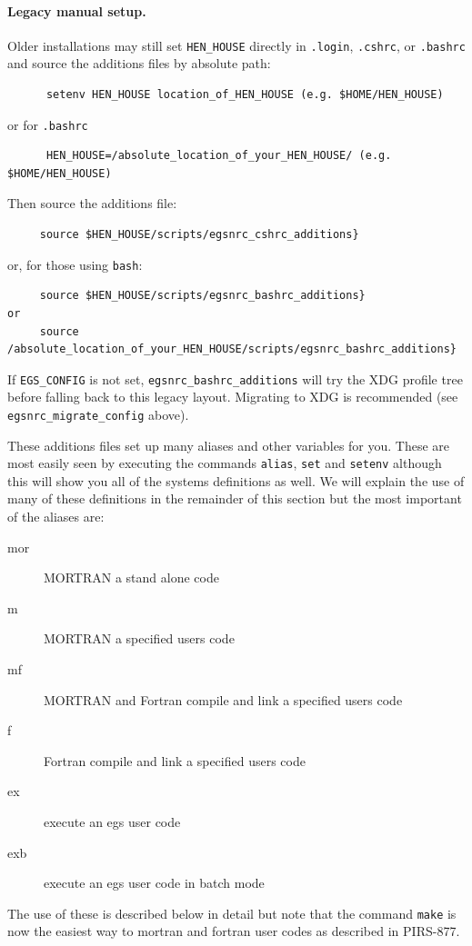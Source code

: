 \paragraph{Legacy manual setup.}
Older installations may still set \verb+HEN_HOUSE+ directly in
{\tt .login}, {\tt .cshrc}, or {\tt .bashrc} and source the additions
files by absolute path:
\begin{verbatim}
      setenv HEN_HOUSE location_of_HEN_HOUSE (e.g. $HOME/HEN_HOUSE)
\end{verbatim}
or for {\tt .bashrc}
\begin{verbatim}
      HEN_HOUSE=/absolute_location_of_your_HEN_HOUSE/ (e.g. $HOME/HEN_HOUSE)
\end{verbatim}
Then source the additions file:
\begin{verbatim}
     source $HEN_HOUSE/scripts/egsnrc_cshrc_additions}
\end{verbatim}
or, for those using {\tt bash}:
\begin{verbatim}
     source $HEN_HOUSE/scripts/egsnrc_bashrc_additions}
or
     source /absolute_location_of_your_HEN_HOUSE/scripts/egsnrc_bashrc_additions}
\end{verbatim}
If \verb+EGS_CONFIG+ is not set, \verb+egsnrc_bashrc_additions+ will try the
XDG profile tree before falling back to this legacy layout.
Migrating to XDG is recommended (see \verb+egsnrc_migrate_config+ above).

These additions files set up many aliases and other variables for you. These
are most easily seen by executing the commands {\tt alias}, {\tt set} and
{\tt setenv} although this will show you all of the systems definitions as
well.  We will explain the use of many of these definitions in the
remainder of this section but the most important of the aliases are:

     
  
\begin{description}
\item[mor]	MORTRAN a stand alone code
\item[m]	MORTRAN a specified users code
\item[mf]	MORTRAN and Fortran compile and link a specified users code
\item[f]	Fortran compile and link a specified users code
\item[ex]	execute an egs user code
\item[exb]	execute an egs user code in batch mode
\end{description}
The use of these is described below in detail but note that the command
{\tt make} is now the easiest way to mortran and fortran user codes as
described in PIRS-877\cite{Ka03}.

